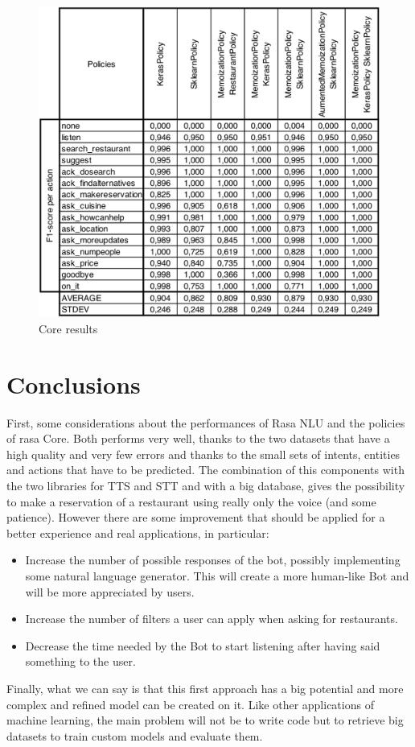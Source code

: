 \documentclass[11pt,a4paper]{article}
\begin{document}
\begin{figure}
  \includegraphics[scale=0.22]{core_results}
  \caption{Core results}
  \label{fig:results2}
\end{figure}



\section{Conclusions}

First, some considerations about the performances of Rasa NLU and the policies of rasa Core. Both performs very well, thanks to the two datasets that have a high quality and very few errors and thanks to the small sets of intents, entities and actions that have to be predicted. The combination of this components with the two libraries for TTS and STT and with a big database, gives the possibility to make a reservation of a restaurant using really only the voice (and some patience). However there are some improvement that should be applied for a better experience and real applications, in particular:
\begin{itemize}
\item Increase the number of possible responses of the bot, possibly implementing some natural language generator. This will create a more human-like Bot and will be more appreciated by users.
\item Increase the number of filters a user can apply when asking for restaurants.
\item Decrease the time needed by the Bot to start listening after having said something to the user.
\end{itemize}
Finally, what we can say is that this first approach has a big potential and more complex and refined model can be created on it. Like other applications of machine learning, the main problem will not be to write code but to retrieve big datasets to train custom models and evaluate them.
\end{document}
